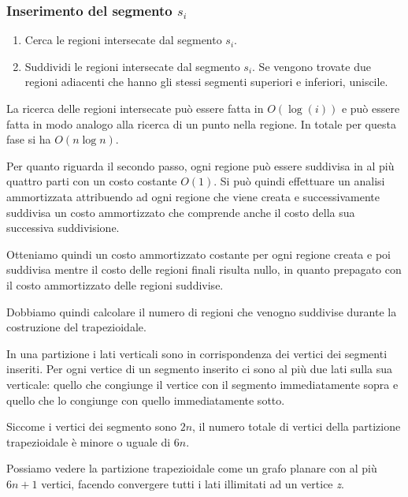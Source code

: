 \subsubsection{Inserimento del segmento $s_i$}\label{inserimento-del-segmento-si}

\begin{enumerate}
\item   Cerca le regioni intersecate dal segmento $s_i$.
\item   Suddividi le regioni intersecate dal segmento $s_i$. Se vengono trovate due regioni adiacenti che hanno gli stessi segmenti superiori e inferiori, uniscile.
\end{enumerate}

La ricerca delle regioni intersecate può essere fatta in $O(\log(i))$ e può essere fatta in modo analogo alla ricerca di un punto nella regione. In totale per questa fase si ha $O(n \log n)$.

Per quanto riguarda il secondo passo, ogni regione può essere suddivisa in al più quattro parti con un costo costante $O(1)$. 
Si può quindi effettuare un analisi ammortizzata attribuendo ad ogni regione che viene creata e successivamente suddivisa un costo ammortizzato che comprende anche il costo della sua successiva suddivisione.

Otteniamo quindi un costo ammortizzato costante per ogni regione creata e poi suddivisa mentre il costo delle regioni finali risulta nullo, in quanto prepagato con il costo ammortizzato delle regioni suddivise.

Dobbiamo quindi calcolare il numero di regioni che venogno suddivise durante la costruzione del trapezioidale.

In una partizione i lati verticali sono in corrispondenza dei vertici dei segmenti inseriti. Per ogni vertice di un segmento inserito ci sono al più due lati sulla sua verticale: quello che congiunge il vertice con il segmento immediatamente sopra e quello che lo congiunge con quello immediatamente sotto.

Siccome i vertici dei segmento sono $2n$, il numero totale di vertici della partizione trapezioidale è minore o uguale di $6n$. 

Possiamo vedere la partizione trapezioidale come un grafo planare con al più $6n+1$ vertici, facendo convergere tutti i lati illimitati ad un vertice \textit{z}.

